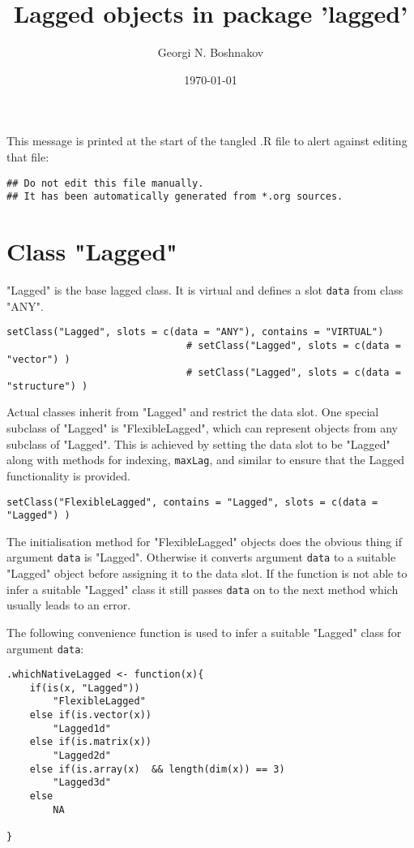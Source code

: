 \documentclass[11pt,a4paper]{article}
\author{Georgi N. Boshnakov}
\date{\today}
\title{Lagged objects in package 'lagged'}
\begin{document}
\maketitle
\tableofcontents

\vspace*{1cm}
This message is printed at the start of the tangled .R file to alert against editing that
file:
\begin{verbatim}
## Do not edit this file manually.
## It has been automatically generated from *.org sources.
\end{verbatim}



\section{Class "Lagged"}
\label{sec:orgfa7184e}


"Lagged" is the base lagged class. It is virtual and defines a slot \texttt{data} from class
"ANY".
\begin{verbatim}
setClass("Lagged", slots = c(data = "ANY"), contains = "VIRTUAL")
                               # setClass("Lagged", slots = c(data = "vector") )
                               # setClass("Lagged", slots = c(data = "structure") )
\end{verbatim}

Actual classes inherit from "Lagged" and restrict the data slot.  One special subclass
of "Lagged" is "FlexibleLagged", which can represent objects from any subclass of
"Lagged". This is achieved by setting  the data slot to be "Lagged" along with methods for
indexing, \texttt{maxLag}, and similar to ensure that the Lagged functionality is provided.
\begin{verbatim}
setClass("FlexibleLagged", contains = "Lagged", slots = c(data = "Lagged") )
\end{verbatim}
The initialisation method for "FlexibleLagged" objects does the obvious thing if argument
\texttt{data} is "Lagged". Otherwise it converts argument \texttt{data} to a suitable "Lagged" object
before assigning it to the data slot. If the function is not able to infer a suitable
"Lagged" class it still passes \texttt{data} on to the next method which usually leads to an error.

The following convenience function is used to infer a suitable "Lagged" class for argument
\texttt{data}:
\begin{verbatim}
.whichNativeLagged <- function(x){
    if(is(x, "Lagged"))
        "FlexibleLagged"
    else if(is.vector(x))
        "Lagged1d"
    else if(is.matrix(x))
        "Lagged2d"
    else if(is.array(x)  && length(dim(x)) == 3)
        "Lagged3d"
    else
        NA

}
\end{verbatim}
\end{document}
